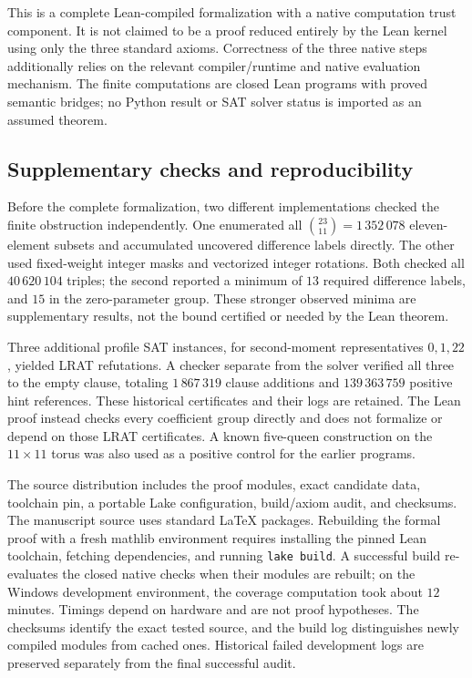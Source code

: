 \documentclass[11pt,a4paper]{article}
\theoremstyle{remark}
\begin{document}
This is a complete Lean-compiled formalization with a native computation
trust component. It is not claimed to be a proof reduced entirely by the
Lean kernel using only the three standard axioms. Correctness of the three
native steps additionally relies on the relevant compiler/runtime and native
evaluation mechanism. The finite computations are closed Lean programs with
proved semantic bridges; no Python result or SAT solver status is imported
as an assumed theorem.

\subsection{Supplementary checks and reproducibility}
Before the complete formalization, two different implementations checked the
finite obstruction independently. One enumerated all
$\binom{23}{11}=1\,352\,078$ eleven-element subsets and accumulated uncovered
difference labels directly. The other used fixed-weight integer masks and
vectorized integer rotations. Both checked all $40\,620\,104$ triples; the
second reported a minimum of $13$ required difference labels, and $15$ in the
zero-parameter group. These stronger observed minima are supplementary
results, not the bound certified or needed by the Lean theorem.

Three additional profile SAT instances, for second-moment representatives
$0,1,22$, yielded LRAT refutations. A checker separate from the solver
verified all three to the empty clause, totaling $1\,867\,319$ clause additions
and $139\,363\,759$ positive hint references. These historical certificates and
their logs are retained. The Lean proof instead checks every coefficient
group directly and does not formalize or depend on those LRAT certificates.
A known five-queen construction on the $11\times11$ torus was also used as
a positive control for the earlier programs.

The source distribution includes the proof modules, exact candidate data,
toolchain pin, a portable Lake configuration, build/axiom audit, and checksums.
The manuscript source uses standard LaTeX packages. Rebuilding the formal
proof with a fresh mathlib environment requires installing the pinned Lean
toolchain, fetching dependencies, and running \texttt{lake build}. A successful
build re-evaluates the closed native checks when their modules are rebuilt;
on the Windows development environment, the coverage computation took about
$12$ minutes. Timings depend on hardware and are not proof hypotheses.
The checksums identify the exact tested source, and the build log distinguishes
newly compiled modules from cached ones. Historical failed development logs
are preserved separately from the final successful audit.
\end{document}
